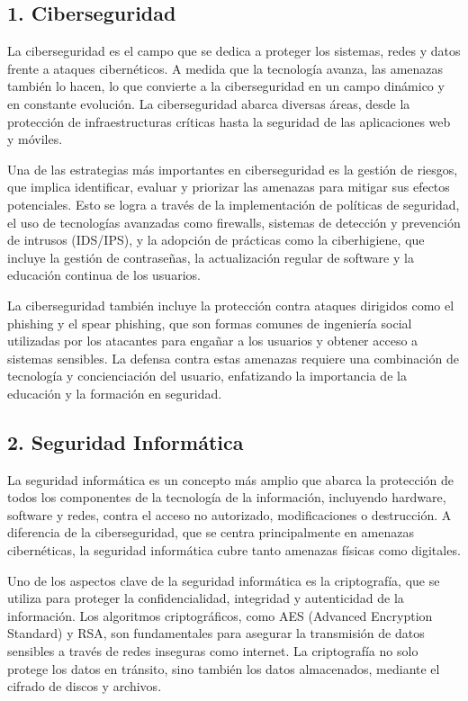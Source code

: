 \documentclass[12pt]{article}
\begin{document}
\subsection*{1. Ciberseguridad}
La ciberseguridad es el campo que se dedica a proteger los sistemas, redes y datos frente a ataques cibernéticos. A medida que la tecnología avanza, las amenazas también lo hacen, lo que convierte a la ciberseguridad en un campo dinámico y en constante evolución. La ciberseguridad abarca diversas áreas, desde la protección de infraestructuras críticas hasta la seguridad de las aplicaciones web y móviles.

Una de las estrategias más importantes en ciberseguridad es la gestión de riesgos, que implica identificar, evaluar y priorizar las amenazas para mitigar sus efectos potenciales. Esto se logra a través de la implementación de políticas de seguridad, el uso de tecnologías avanzadas como firewalls, sistemas de detección y prevención de intrusos (IDS/IPS), y la adopción de prácticas como la ciberhigiene, que incluye la gestión de contraseñas, la actualización regular de software y la educación continua de los usuarios.

La ciberseguridad también incluye la protección contra ataques dirigidos como el phishing y el spear phishing, que son formas comunes de ingeniería social utilizadas por los atacantes para engañar a los usuarios y obtener acceso a sistemas sensibles. La defensa contra estas amenazas requiere una combinación de tecnología y concienciación del usuario, enfatizando la importancia de la educación y la formación en seguridad.

\subsection*{2. Seguridad Informática}
La seguridad informática es un concepto más amplio que abarca la protección de todos los componentes de la tecnología de la información, incluyendo hardware, software y redes, contra el acceso no autorizado, modificaciones o destrucción. A diferencia de la ciberseguridad, que se centra principalmente en amenazas cibernéticas, la seguridad informática cubre tanto amenazas físicas como digitales.

Uno de los aspectos clave de la seguridad informática es la criptografía, que se utiliza para proteger la confidencialidad, integridad y autenticidad de la información. Los algoritmos criptográficos, como AES (Advanced Encryption Standard) y RSA, son fundamentales para asegurar la transmisión de datos sensibles a través de redes inseguras como internet. La criptografía no solo protege los datos en tránsito, sino también los datos almacenados, mediante el cifrado de discos y archivos.
\end{document}
